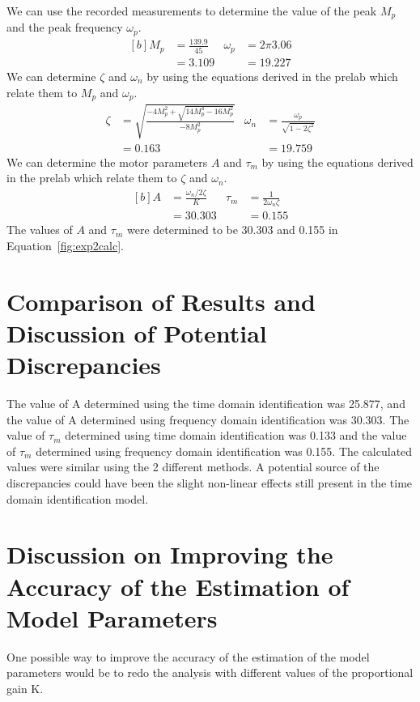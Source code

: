 \documentclass[12pt]{article}
\begin{document}
We can use the recorded measurements to determine the value of the peak $M_p$ and the peak frequency $\omega_p$.
\begin{equation*}
\begin{aligned}[b]
    M_p &= \frac{139.9}{45} & \omega_p &= 2\pi3.06 \\
    &= 3.109 & &= 19.227
\end{aligned}
\end{equation*}
We can determine $\zeta$ and $\omega_n$ by using the equations derived in the prelab which relate them to $M_p$ and $\omega_p$.
\begin{equation*}
\begin{aligned}
    \zeta &= \sqrt{\frac{-4M_p^2 + \sqrt{14M_p^4 - 16M_p^2}}{-8M_p^2}} & \omega_n &= \frac{\omega_p}{\sqrt{1-2\zeta^2}} \\
    &= 0.163 & &= 19.759
\end{aligned}
\end{equation*}
We can determine the motor parameters $A$ and $\tau_m$ by using the equations derived in the prelab which relate them to $\zeta$ and $\omega_n$.
\begin{equation} \label{fig:exp2calc}
\begin{aligned}[b]
    A &= \frac{\omega_n / 2\zeta}{K} & \tau_m &= \frac{1}{2\omega_n\zeta} \\
    &= 30.303 & &= 0.155
\end{aligned}
\end{equation}
The values of $A$ and $\tau_m$ were determined to be 30.303 and 0.155 in Equation~\ref{fig:exp2calc}.

\section*{Comparison of Results and Discussion of Potential Discrepancies}
The value of A determined using the time domain identification was 25.877, and the value of A determined using frequency domain identification was 30.303. The value of $\tau_m$ determined using time domain identification was 0.133 and the value of $\tau_m$ determined using frequency domain identification was 0.155. The calculated values were similar using the 2 different methods. A potential source of the discrepancies could have been the slight non-linear effects still present in the time domain identification model.

\section*{Discussion on Improving the Accuracy of the Estimation of Model Parameters}
One possible way to improve the accuracy of the estimation of the model parameters would be to redo the analysis with different values of the proportional gain K.
\end{document}

